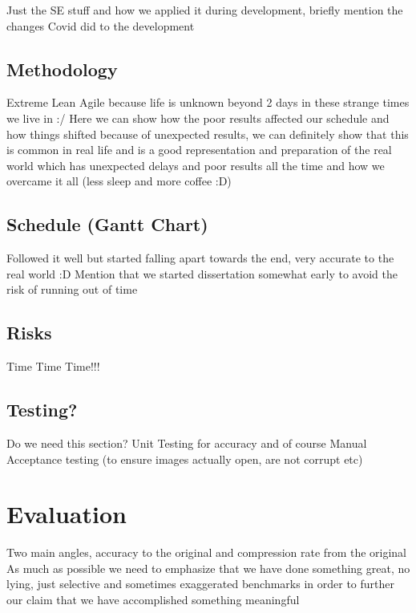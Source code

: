 \documentclass[12pt]{article}
\begin{document}
    Just the SE stuff and how we applied it during development, briefly mention the changes Covid did to the development

    \subsection{Methodology}

    Extreme Lean Agile because life is unknown beyond 2 days in these strange times we live in :/
    \linebreak
    Here we can show how the poor results affected our schedule and how things shifted because of unexpected results,
    we can definitely show that this is common in real life and is a good representation and preparation of the real world
    which has unexpected delays and poor results all the time and how we overcame it all (less sleep and more coffee :D)

    \subsection{Schedule (Gantt Chart)}

    Followed it well but started falling apart towards the end, very accurate to the real world :D
    \linebreak
    Mention that we started dissertation somewhat early to avoid the risk of running out of time

    \subsection{Risks}

    Time Time Time!!!

    \subsection{Testing?}

    Do we need this section?
    \linebreak
    Unit Testing for accuracy and of course Manual Acceptance testing (to ensure images actually open, are not corrupt etc)

    \pagebreak


    \section{Evaluation}

    Two main angles, accuracy to the original and compression rate from the original
    \linebreak
    As much as possible we need to emphasize that we have done something great,
    no lying, just selective and sometimes exaggerated benchmarks in order to further our claim that we
    have accomplished something meaningful
\end{document}
